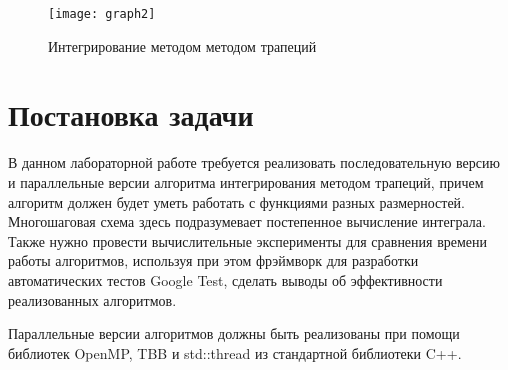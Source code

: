 \documentclass{report}
\begin{document}
\begin{figure}[hp]
    \centering
    \texttt{[image: graph2]}
    \caption{Интегрирование методом методом трапеций}
\end{figure}

\newpage

\section*{Постановка задачи}
\par В данном лабораторной работе требуется реализовать последовательную версию и параллельные версии алгоритма интегрирования методом трапеций, причем алгоритм должен будет уметь работать с функциями разных размерностей. Многошаговая схема здесь подразумевает постепенное вычисление интеграла. Также нужно провести вычислительные эксперименты для сравнения времени работы алгоритмов, используя при этом фрэймворк для разработки автоматических тестов Google Test, сделать выводы об эффективности реализованных алгоритмов.
\par Параллельные версии алгоритмов должны быть реализованы при помощи библиотек OpenMP, TBB и std::thread из стандартной библиотеки C++.
\newpage

\end{document}
